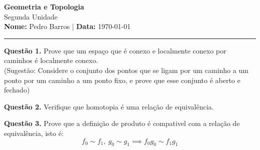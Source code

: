 \documentclass[12pt, a4paper]{article}
\newenvironment{problem}[1]{\par\vspace{1.2em}\noindent\textbf{Questão #1.}}{\par\vspace{0.5em}}
\begin{document}
\thispagestyle{empty} %
\begin{center}
    {\Large \textbf{Geometria e Topologia}} \\[0.4em]
    {\large Segunda Unidade} \\[0.4em]
    \textbf{Nome:} Pedro Barros \quad | \quad \textbf{Data:} \today
\end{center}

\hrule
\vspace{1.5em}

\begin{problem}{1}
    Prove que um espaço que é conexo e localmente conexo por caminhos é localmente conexo.\\
    (Sugestão: Considere o conjunto dos pontos que se ligam por um caminho a um ponto por um caminho a um ponto fixo, e prove que esse conjunto é aberto e fechado)
\end{problem}

\begin{problem}{2}
    Verifique que homotopia é uma relação de equivalência.
\end{problem}

\begin{problem}{3} 
    Prove que a definição de produto é compativel com a relação de equivalência, isto é:
    \[
        f_0 \sim  f_1, \ g_0\sim g_1 \implies f_0g_0 \sim  f_1g_1
    \]
\end{problem}
\end{document}
